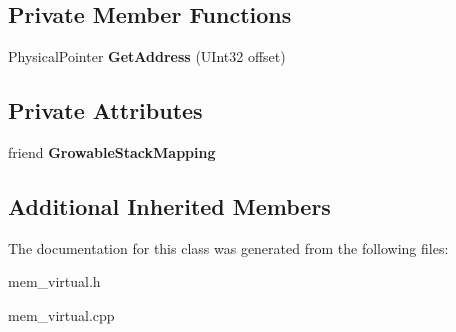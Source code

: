 \subsection*{Private Member Functions}
\begin{DoxyCompactItemize}
\item 
\mbox{\label{class_growable_stack_ab5c4f65e9a4405e6171b8a2567e6f6e5}} 
Physical\+Pointer {\bfseries Get\+Address} (U\+Int32 offset)
\end{DoxyCompactItemize}
\subsection*{Private Attributes}
\begin{DoxyCompactItemize}
\item 
\mbox{\label{class_growable_stack_acc455b20594b72ffa8f76786fc5ba113}} 
friend {\bfseries Growable\+Stack\+Mapping}
\end{DoxyCompactItemize}
\subsection*{Additional Inherited Members}


The documentation for this class was generated from the following files\+:\begin{DoxyCompactItemize}
\item 
mem\+\_\+virtual.\+h\item 
mem\+\_\+virtual.\+cpp\end{DoxyCompactItemize}
